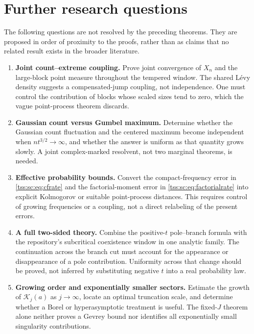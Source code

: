 \documentclass[11pt]{article}
\theoremstyle{remark}\newtheorem{remark}[theorem]{Remark}
\theoremstyle{definition}\newtheorem{definition}[theorem]{Definition}
\newcommand{\Kc}{\mathcal K}
\begin{document}
\section{Further research questions}
\label{tss:sc:sec:questions}

The following questions are not resolved by the preceding theorems. They are proposed in order of proximity to the proofs, rather than as claims that no related result exists in the broader literature.

\begin{enumerate}[label=\textbf{RQ\arabic*.},leftmargin=3.4em]
\item \textbf{Joint count--extreme coupling.} Prove joint convergence of $X_n$ and the large-block point measure throughout the tempered window. The shared L\'evy density suggests a compensated-jump coupling, not independence. One must control the contribution of blocks whose scaled sizes tend to zero, which the vague point-process theorem discards.

\item \textbf{Gaussian count versus Gumbel maximum.} Determine whether the Gaussian count fluctuation and the centered maximum become independent when $nt^{3/2}\to\infty$, and whether the answer is uniform as that quantity grows slowly. A joint complex-marked resolvent, not two marginal theorems, is needed.

\item \textbf{Effective probability bounds.} Convert the compact-frequency error in \eqref{tss:sc:eq:cfrate} and the factorial-moment error in \eqref{tss:sc:eq:factorialrate} into explicit Kolmogorov or suitable point-process distances. This requires control of growing frequencies or a coupling, not a direct relabeling of the present errors.

\item \textbf{A full two-sided theory.} Combine the positive-$t$ pole--branch formula with the repository's subcritical coexistence window in one analytic family. The continuation across the branch cut must account for the appearance or disappearance of a pole contribution. Uniformity across that change should be proved, not inferred by substituting negative $t$ into a real probability law.

\item \textbf{Growing order and exponentially smaller sectors.} Estimate the growth of $\Kc_j(a)$ as $j\to\infty$, locate an optimal truncation scale, and determine whether a Borel or hyperasymptotic treatment is useful. The fixed-$J$ theorem alone neither proves a Gevrey bound nor identifies all exponentially small singularity contributions.


\end{enumerate}
\end{document}
